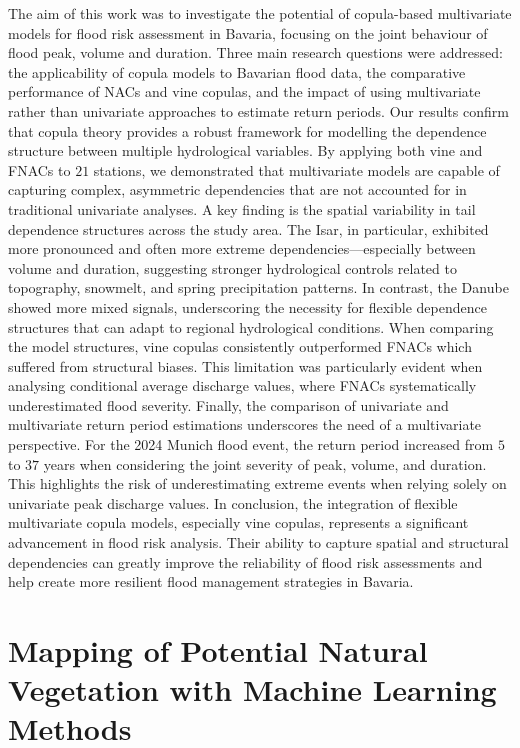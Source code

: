 \documentclass[
]{krantz}
\begin{document}
The aim of this work was to investigate the potential of copula-based multivariate models for flood risk assessment in Bavaria, focusing on the joint behaviour of flood peak, volume and duration.
Three main research questions were addressed: the applicability of copula models to Bavarian flood data, the comparative performance of NACs and vine copulas, and the impact of using multivariate rather than univariate approaches to estimate return periods.
Our results confirm that copula theory provides a robust framework for modelling the dependence structure between multiple hydrological variables. By applying both vine and FNACs to \(21\) stations, we demonstrated that multivariate models are capable of capturing complex, asymmetric dependencies that are not accounted for in traditional univariate analyses.
A key finding is the spatial variability in tail dependence structures across the study area. The Isar, in particular, exhibited more pronounced and often more extreme dependencies---especially between volume and duration, suggesting stronger hydrological controls related to topography, snowmelt, and spring precipitation patterns.
In contrast, the Danube showed more mixed signals, underscoring the necessity for flexible dependence structures that can adapt to regional hydrological conditions.
When comparing the model structures, vine copulas consistently outperformed FNACs which suffered from structural biases. This limitation was particularly evident when analysing conditional average discharge values, where FNACs systematically underestimated flood severity.
Finally, the comparison of univariate and multivariate return period estimations underscores the need of a multivariate perspective.
For the 2024 Munich flood event, the return period increased from \(5\) to \(37\) years when considering the joint severity of peak, volume, and duration. This highlights the risk of underestimating extreme events when relying solely on univariate peak discharge values.
In conclusion, the integration of flexible multivariate copula models, especially vine copulas, represents a significant advancement in flood risk analysis. Their ability to capture spatial and structural dependencies can greatly improve the reliability of flood risk assessments and help create more resilient flood management strategies in Bavaria.

\chapter{Mapping of Potential Natural Vegetation with Machine Learning Methods}\label{mapping-of-potential-natural-vegetation-with-machine-learning-methods}
\end{document}
